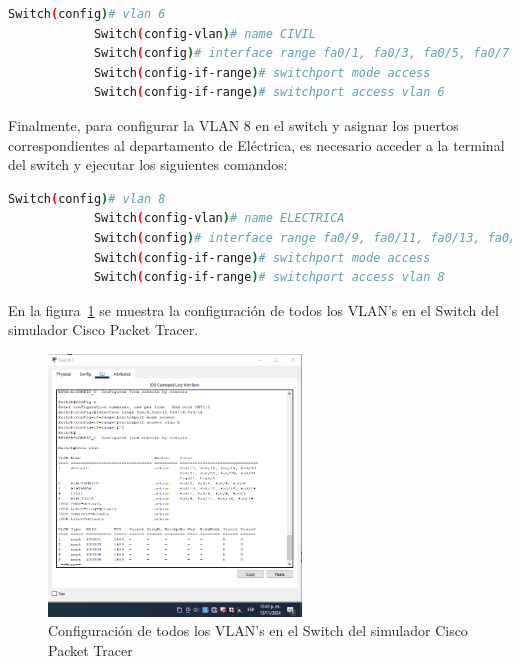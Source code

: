         \begin{lstlisting}[language=bash, caption={Creación y configuración de la VLAN 6},label={lst:cisco_vlan6}]
            Switch(config)# vlan 6
            Switch(config-vlan)# name CIVIL
            Switch(config)# interface range fa0/1, fa0/3, fa0/5, fa0/7
            Switch(config-if-range)# switchport mode access
            Switch(config-if-range)# switchport access vlan 6
        \end{lstlisting}

        Finalmente, para configurar la VLAN 8 en el switch y asignar los puertos correspondientes al departamento de Eléctrica, es necesario acceder a la terminal del switch y ejecutar los siguientes comandos:

        \begin{lstlisting}[language=bash, caption={Creación y configuración de la VLAN 8},label={lst:cisco_vlan8}]
            Switch(config)# vlan 8
            Switch(config-vlan)# name ELECTRICA
            Switch(config)# interface range fa0/9, fa0/11, fa0/13, fa0/15
            Switch(config-if-range)# switchport mode access
            Switch(config-if-range)# switchport access vlan 8
        \end{lstlisting}

        En la figura~\ref{fig:cisco_vlan_PC1} se muestra la configuración de todos los VLAN's en el Switch del simulador Cisco Packet Tracer.

        \begin{figure}[H]
            \centering
            \includegraphics[width=0.6\textwidth]{img/cisco_vlan_PC1.png}
            \caption{Configuración de todos los VLAN's en el Switch del simulador Cisco Packet Tracer}
            \label{fig:cisco_vlan_PC1}
        \end{figure}


